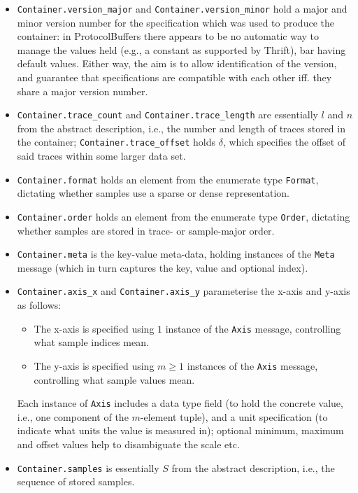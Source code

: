 \documentclass[10pt,a4paper]{llncs}
\newcommand{\VERB}[1]{\mbox{\lstinline[basicstyle=\tt]{#1}}}
\begin{document}
\begin{itemize}
\item \VERB{Container.version_major}
      and
      \VERB{Container.version_minor}
      hold a major and minor version number for the specification which was
      used to produce the container: in {\sf ProtocolBuffers} there appears
      to be no automatic way to manage the values held (e.g., a constant as
      supported by {\sf Thrift}), bar having default values.  Either way,
      the aim is to allow identification of the version, and guarantee that
      specifications are compatible with each other iff. they share a major
      version number.  
\item \VERB{Container.trace_count}
      and
      \VERB{Container.trace_length}
      are essentially $l$ and $n$ from the abstract description, i.e., the
      number and length of traces stored in the container;
      \VERB{Container.trace_offset} 
      holds $\delta$, which specifies the offset of said traces within some
      larger data set.
\item \VERB{Container.format}
      holds an element from the enumerate type \VERB{Format}, 
      dictating whether samples use a sparse or dense representation.
\item \VERB{Container.order}
      holds an element from the enumerate type \VERB{Order}, 
      dictating whether samples are stored in trace- or sample-major order.
\item \VERB{Container.meta}
      is the key-value meta-data, holding instances of the \VERB{Meta} 
      message (which in turn captures the key, value and optional index).
\item \VERB{Container.axis_x}
      and
      \VERB{Container.axis_y}
      parameterise the x-axis and y-axis as follows:

      \begin{itemize}
      \item The x-axis is specified using        $1$ instance  of the 
            \VERB{Axis} message, controlling what sample indices mean.
      \item The y-axis is specified using $m \geq 1$ instances of the 
            \VERB{Axis} message, controlling what sample values  mean.
      \end{itemize}

      \noindent
      Each instance of \VERB{Axis} includes a data type field (to hold the
      concrete value, i.e., one component of the $m$-element tuple), and a 
      unit specification (to indicate what units the value is measured in);
      optional minimum, maximum and offset values help to disambiguate the
      scale etc.
\item \VERB{Container.samples}
      is essentially $S$ from the abstract description, i.e., the sequence
      of stored samples.
\end{itemize}
\end{document}
